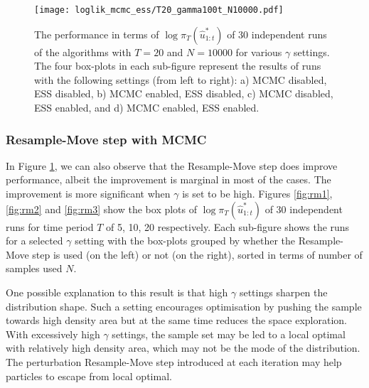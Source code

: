 \begin{figure}[!thbp]
\begin{minipage}{0.5\textwidth}
    \end{minipage}%
    \begin{minipage}{0.5\textwidth}
        \centering
        \texttt{[image: loglik\_mcmc\_ess/T20\_gamma100t\_N10000.pdf]}
    \end{minipage}
    \caption{The performance in terms of $\log\pi_T(\hat{u}^*_{1:t})$ of 30 independent runs of the algorithms  with $T=20$ and $N=10000$ for various $\gamma$ settings. The four box-plots in each sub-figure represent the results of runs with the following settings (from left to right): a) MCMC disabled, ESS disabled, b) MCMC enabled, ESS disabled, c) MCMC disabled, ESS enabled, and d) MCMC enabled, ESS enabled.   }
    \label{fig:ess}
\end{figure}

\subsubsection{Resample-Move step with MCMC}
In Figure \ref{fig:ess}, we can also observe that the Resample-Move step does improve performance, albeit the improvement is marginal  in most of the cases. The improvement is more significant when $\gamma$ is set to be high. Figures \ref{fig:rm1}, \ref{fig:rm2} and \ref{fig:rm3} show the box plots of $\log\pi_T(\hat{u}^*_{1:t})$ of $30$ independent runs for time period $T$ of 5, 10, 20 respectively. Each sub-figure shows the runs for a selected $\gamma$ setting with the box-plots grouped by whether the Resample-Move step is used (on the left) or not (on the right), sorted in terms of number of samples used $N$.

One possible explanation to this result is that high $\gamma$ settings sharpen the distribution shape. Such a setting encourages optimisation by pushing the sample towards  high density area but at the same time reduces the space exploration. With excessively high $\gamma$ settings, the sample set may be led to a local optimal with relatively high density area, which may not be the mode of the distribution. The perturbation Resample-Move step introduced at each iteration may help particles to escape from local optimal.

